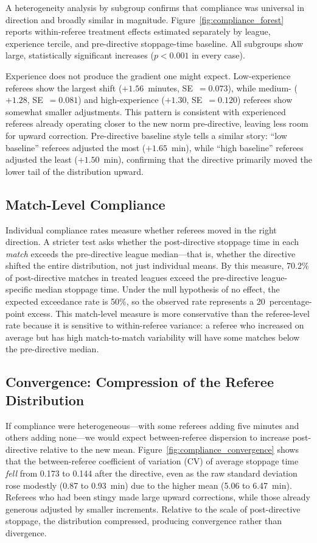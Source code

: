 A heterogeneity analysis by subgroup confirms that compliance was
universal in direction and broadly similar in magnitude.
Figure~\ref{fig:compliance_forest} reports within-referee treatment
effects estimated separately by league, experience tercile, and
pre-directive stoppage-time baseline. All subgroups show large,
statistically significant increases ($p < 0.001$ in every case).

Experience does not produce the gradient one might expect.
Low-experience referees show the largest shift ($+1.56$~minutes,
SE~$= 0.073$), while medium- ($+1.28$, SE~$= 0.081$) and
high-experience ($+1.30$, SE~$= 0.120$) referees show somewhat
smaller adjustments. This pattern is consistent with experienced
referees already operating closer to the new norm pre-directive, leaving
less room for upward correction. Pre-directive baseline style tells a
similar story: ``low baseline'' referees adjusted the most ($+1.65$~min),
while ``high baseline'' referees adjusted the least ($+1.50$~min),
confirming that the directive primarily moved the lower tail of the
distribution upward.

\subsection{Match-Level Compliance}

Individual compliance rates measure whether referees moved in the
right direction. A stricter test asks whether the post-directive
stoppage time in each \emph{match} exceeds the pre-directive league
median---that is, whether the directive shifted the entire
distribution, not just individual means. By this measure, 70.2\% of
post-directive matches in treated leagues exceed the pre-directive
league-specific median stoppage time. Under the null hypothesis of no
effect, the expected exceedance rate is 50\%, so the observed
rate represents a 20~percentage-point excess. This match-level measure
is more conservative than the referee-level rate because it is
sensitive to within-referee variance: a referee who increased on
average but has high match-to-match variability will have some matches
below the pre-directive median.

\subsection{Convergence: Compression of the Referee Distribution}

If compliance were heterogeneous---with some referees adding five
minutes and others adding none---we would expect between-referee
dispersion to increase post-directive relative to the new mean.
Figure~\ref{fig:compliance_convergence} shows that the between-referee
coefficient of variation (CV) of average stoppage time \emph{fell}
from 0.173 to 0.144 after the directive, even as the raw standard
deviation rose modestly (0.87 to 0.93~min) due to the higher mean
(5.06 to 6.47~min). Referees who had been stingy made large upward
corrections, while those already generous adjusted by smaller
increments. Relative to the scale of post-directive stoppage, the
distribution compressed, producing convergence rather than divergence.

